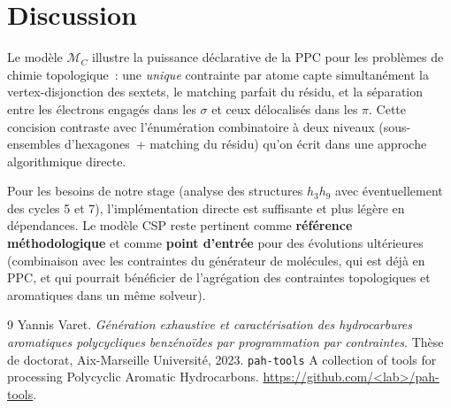 \documentclass[a4paper,11pt]{article}
\begin{document}
\section{Discussion}

Le mod\`ele $\mathcal{M}_C$ illustre la puissance d\'eclarative de la PPC pour les probl\`emes
de chimie topologique~: une \emph{unique} contrainte par atome capte simultan\'ement la
vertex-disjonction des sextets, le matching parfait du r\'esidu, et la s\'eparation entre les
\'electrons engag\'es dans les $\sigma$ et ceux d\'elocalis\'es dans les $\pi$. Cette concision
contraste avec l'\'enum\'eration combinatoire \`a deux niveaux (sous-ensembles d'hexagones~+
matching du r\'esidu) qu'on \'ecrit dans une approche algorithmique directe.

Pour les besoins de notre stage (analyse des structures $h_3$\textendash{}$h_9$ avec
\'eventuellement des cycles 5 et 7), l'impl\'ementation directe est suffisante et plus l\'eg\`ere
en d\'ependances. Le mod\`ele CSP reste pertinent comme \textbf{r\'ef\'erence m\'ethodologique}
et comme \textbf{point d'entr\'ee} pour des \'evolutions ult\'erieures (combinaison avec les
contraintes du g\'en\'erateur de mol\'ecules, qui est d\'ej\`a en PPC, et qui pourrait b\'en\'eficier
de l'agr\'egation des contraintes topologiques et aromatiques dans un m\^eme solveur).

\begin{thebibliography}{9}
Yannis Varet. \emph{G\'en\'eration exhaustive et caract\'erisation des hydrocarbures aromatiques
polycycliques benz\'eno\"ides par programmation par contraintes}. Th\`ese de doctorat,
Aix-Marseille Universit\'e, 2023.
\texttt{pah-tools} \textendash{} A collection of tools for processing Polycyclic Aromatic
Hydrocarbons. \url{https://github.com/<lab>/pah-tools}.
\end{thebibliography}
\end{document}

